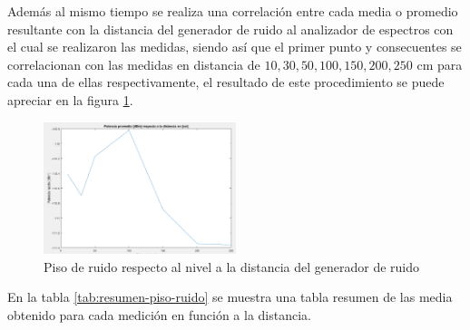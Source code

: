 \documentclass[conference]{IEEEtran}
\begin{document}
	Además al mismo tiempo se realiza una correlación entre cada media o promedio resultante con la distancia del generador de ruido al analizador de espectros con el cual se realizaron las medidas, siendo así que el primer punto y consecuentes se correlacionan con las medidas en distancia de $10, 30, 50, 100, 150, 200, 250$ cm para cada una de ellas respectivamente, el resultado de este procedimiento se puede apreciar en la figura \ref{fig:potencia-distancia}.
	
	\begin{figure}[h]
		\centering
		\includegraphics[width=0.5\textwidth]{media/potencia-distancia}
		\caption{Piso de ruido respecto al nivel a la distancia del generador de ruido}
		\label{fig:potencia-distancia}
	\end{figure}
	
	En la tabla \ref{tab:resumen-piso-ruido} se muestra una tabla resumen de las media obtenido para cada medición en función a la distancia.
	
\end{document}

